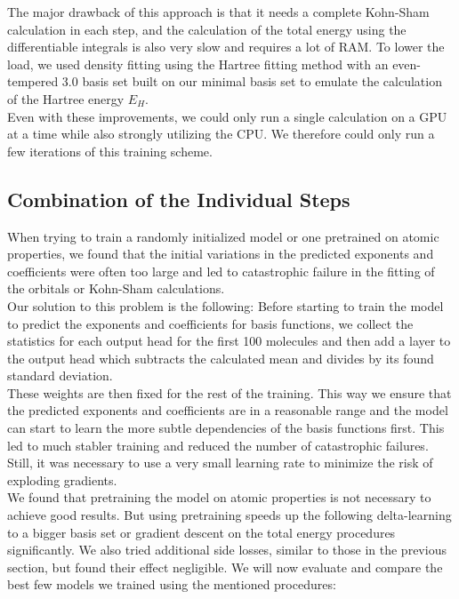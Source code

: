 The major drawback of this approach is that it needs a complete Kohn-Sham calculation in each step, and the calculation of the total energy using the differentiable integrals is also very slow and requires a lot of RAM. To lower the load, we used density fitting using the Hartree fitting method with an even-tempered 3.0 basis set built on our minimal basis set to emulate the calculation of the Hartree energy $E_H$. \\
Even with these improvements, we could only run a single calculation on a GPU at a time while also strongly utilizing the CPU. We therefore could only run a few iterations of this training scheme.


\subsection{Combination of the Individual Steps}
When trying to train a randomly initialized model or one pretrained on atomic properties, we found that the initial variations in the predicted exponents and coefficients were often too large and led to catastrophic failure in the fitting of the orbitals or Kohn-Sham calculations.\\
Our solution to this problem is the following: Before starting to train the model to predict the exponents and coefficients for basis functions, we collect the statistics for each output head for the first 100 molecules and then add a layer to the output head which subtracts the calculated mean and divides by its found standard deviation. \\
These weights are then fixed for the rest of the training.
This way we ensure that the predicted exponents and coefficients are in a reasonable range and the model can start to learn the more subtle dependencies of the basis functions first.
This led to much stabler training and reduced the number of catastrophic failures.
Still, it was necessary to use a very small learning rate to minimize the risk of exploding gradients.\\
We found that pretraining the model on atomic properties is not necessary to achieve good results.
But using pretraining speeds up the following delta-learning to a bigger basis set or gradient descent on the total energy procedures significantly.
We also tried additional side losses, similar to those in the previous section, but found their effect negligible.
We will now evaluate and compare the best few models we trained using the mentioned procedures:
